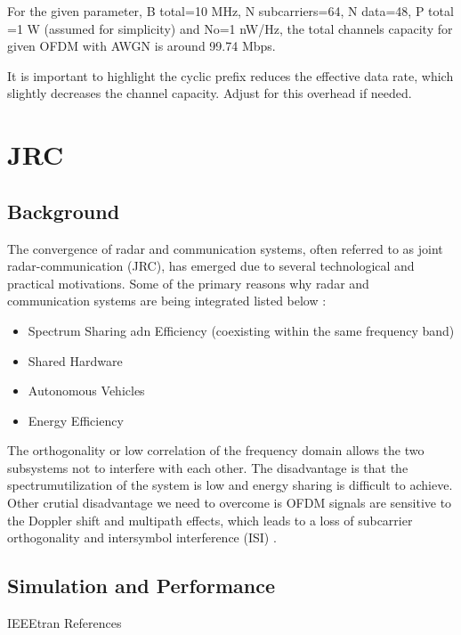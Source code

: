 \documentclass[conference]{IEEEtran}
\begin{document}
  	  For the given parameter, B total=10 MHz, N subcarriers=64, N data=48, P total =1 W (assumed for simplicity) and No=1 nW/Hz, the total channels capacity for given OFDM  with AWGN is around 99.74 Mbps. \par
  	 It is important to highlight the cyclic prefix reduces the effective data rate, which slightly decreases the channel capacity. Adjust for this overhead if needed.
 
  	  
    
    \section {JRC}
		 \subsection {Background}
		 
 The convergence of radar and communication systems, often referred to as joint radar-communication (JRC), has emerged due to several technological and practical motivations. Some of the primary reasons why radar and communication systems are being integrated listed below :
 
 \begin{itemize}
 \item Spectrum Sharing adn Efficiency (coexisting within the same frequency band)
\item Shared Hardware
\item Autonomous Vehicles
\item Energy Efficiency		 
\end{itemize}		 
		 
The orthogonality or low correlation of the frequency domain allows the two subsystems not to interfere with each other. The disadvantage is that the spectrumutilization of the system is low and energy sharing is difficult to achieve. Other crutial disadvantage we need to overcome is OFDM signals are sensitive to the Doppler shift and multipath effects, which leads to a loss of subcarrier orthogonality and intersymbol interference (ISI) \cite{9992221}.

\subsection {Simulation and Performance}
      


	 {IEEEtran}
	 {References}
	
  
\end{document}
